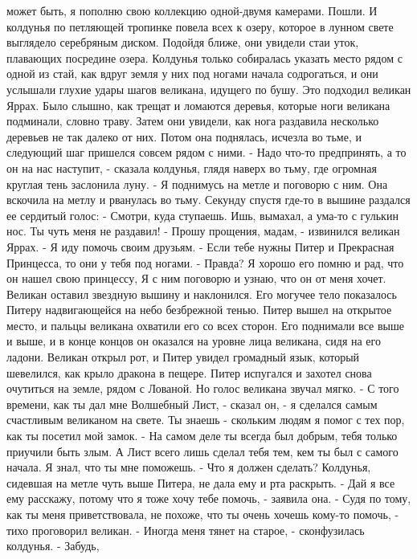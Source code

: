 может быть, я пополню свою коллекцию одной-двумя камерами. Пошли.
    И колдунья по петляющей тропинке повела всех к озеру, которое в 
лунном свете выглядело серебряным диском. Подойдя ближе, они увидели 
стаи уток, плавающих посредине озера.
    Колдунья только собиралась указать место рядом с одной из стай, 
как вдруг земля у них под ногами начала содрогаться, и они услышали 
глухие удары шагов великана, идущего по бушу. Это подходил великан 
Яррах. Было слышно, как трещат и ломаются деревья, которые ноги 
великана подминали, словно траву.
    Затем они увидели, как нога раздавила несколько деревьев не так 
далеко от них. Потом она поднялась, исчезла во тьме, и следующий шаг 
пришелся совсем рядом с ними.
    - Надо что-то предпринять, а то он на нас наступит, - сказала 
колдунья, глядя наверх во тьму, где огромная круглая тень заслонила 
луну. - Я поднимусь на метле и поговорю с ним.
    Она вскочила на метлу и рванулась во тьму. Секунду спустя где-то в 
вышине раздался ее сердитый голос:
    - Смотри, куда ступаешь. Ишь, вымахал, а ума-то с гулькин нос. Ты 
чуть меня не раздавил!
    - Прошу прощения, мадам, - извинился великан Яррах. - Я иду помочь 
своим друзьям.
    - Если тебе нужны Питер и Прекрасная Принцесса, то они у тебя под 
ногами.
    - Правда? Я хорошо его помню и рад, что он нашел свою принцессу, Я 
с ним поговорю и узнаю, что он от меня хочет.
    Великан оставил звездную вышину и наклонился. Его могучее тело 
показалось Питеру надвигающейся на небо безбрежной тенью. Питер вышел 
на открытое место, и пальцы великана охватили его со всех сторон. Его 
поднимали все выше и выше, и в конце концов он оказался на уровне лица 
великана, сидя на его ладони. Великан открыл рот, и Питер увидел 
громадный язык, который шевелился, как крыло дракона в пещере. Питер 
испугался и захотел снова очутиться на земле, рядом с Лованой. Но 
голос великана звучал мягко.
    - С того времени, как ты дал мне Волшебный Лист, - сказал он, - я 
сделался самым счастливым великаном на свете. Ты знаешь - скольким 
людям я помог с тех пор, как ты посетил мой замок.
    - На самом деле ты всегда был добрым, тебя только приучили быть 
злым. А Лист всего лишь сделал тебя тем, кем ты был с самого начала. Я 
знал, что ты мне поможешь.
    - Что я должен сделать?
    Колдунья, сидевшая на метле чуть выше Питера, не дала ему и рта 
раскрыть.
    - Дай я все ему расскажу, потому что я тоже хочу тебе помочь, - 
заявила она.
    - Судя по тому, как ты меня приветствовала, не похоже, что ты 
очень хочешь кому-то помочь, - тихо проговорил великан.
    - Иногда меня тянет на старое, - сконфузилась колдунья. - Забудь, 
